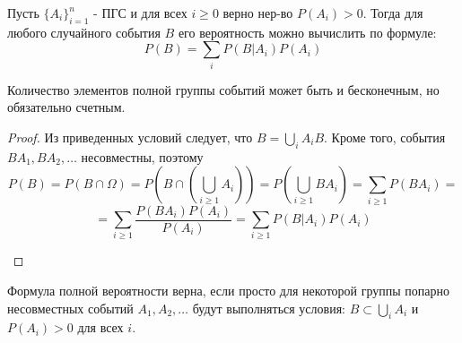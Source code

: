 \begin{definition}
	Пусть $\{A_i\}_{i=1}^{n}$ - ПГС и для всех $i \ge 0$ верно нер-во $P(A_i) > 0$. Тогда для любого случайного события $B$ его вероятность можно вычислить по формуле:
	\[ P(B) = \sum_{i} P(B|A_i) P(A_i) \]
\end{definition}
\begin{remark}
	Количество элементов полной группы событий может быть и бесконечным, но обязательно счетным.
\end{remark}
\begin{proof}
	Из приведенных условий следует, что $B = \bigcup\limits_{i}A_iB$. Кроме того, события $BA_1, BA_2, \dots$ несовместны, поэтому
	\[ P(B) = P(B \cap \Omega) = P \left( B \cap \left( \bigcup\limits_{i \ge 1} A_i \right) \right) = P \left( \bigcup\limits_{i \ge 1} BA_i \right) = \sum_{i \ge 1} P(BA_i) = \]
	\[ = \sum_{i \ge 1} \frac{P(BA_i) P(A_i)}{P(A_i)} = \sum_{i \ge 1} P(B|A_i) P(A_i) \]
	\begin{figure}[H]
	\end{figure}
\end{proof}
\begin{remark}
	Формула полной вероятности верна, если просто для некоторой группы попарно несовместных событий $A_1, A_2, \dots$ будут выполняться условия: $B \subset \bigcup\limits_{i} A_i$ и $P(A_i) > 0$ для всех $i$.
\end{remark}

